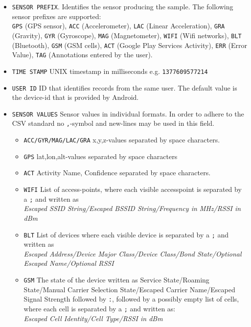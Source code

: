 \begin{itemize}
\item \texttt{SENSOR PREFIX}. Identifies the sensor producing the
  sample. The following sensor prefixes are supported: \\
  \texttt{GPS} (GPS sensor), \texttt{ACC} (Accelerometer),
  \texttt{LAC} (Linear Acceleration), \texttt{GRA} (Gravity),
  \texttt{GYR} (Gyroscope), \texttt{MAG} (Magnetometer), \texttt{WIFI}
  (Wifi networks), \texttt{BLT} (Bluetooth), \texttt{GSM} (GSM cells),
  \texttt{ACT} (Google Play Services Activity), \texttt{ERR} (Error
  Value), \texttt{TAG} (Annotations entered by the user).
\item \texttt{TIME STAMP} UNIX timestamp in milliseconds
  e.g. \texttt{1377609577214}
\item \texttt{USER ID} ID that identifies records from the same
  user. The default value is the device-id that is provided by
  Android.
\item \texttt{SENSOR VALUES} Sensor values in individual formats. In
  order to adhere to the CSV standard no \texttt{,}-symbol and
  new-lines may be used in this field.
  \begin{itemize}
  \item \texttt{ACC/GYR/MAG/LAC/GRA} x,y,z-values separated by space characters.
  \item \texttt{GPS} lat,lon,alt-values separated by space characters
  \item \texttt{ACT} Activity Name, Confidence separated by space characters.
  \item \texttt{WIFI} List of access-points, where each visible
    accesspoint is separated by a \texttt{;} and written as \\
    {\it Escaped SSID String/Escaped BSSID String/Frequency in MHz/RSSI in dBm}
  \item \texttt{BLT}
    List of devices where each visible device is separated by a \texttt{;}
    and written as \\
    { \it Escaped Address/Device Major Class/Device Class/Bond
      State/Optional Escaped Name/Optional RSSI }
  \item \texttt{GSM}
    The state of the device written as Service State/Roaming State/Manual
    Carrier Selection State/Escaped Carrier Name/Escaped Signal Strength
    followed by \texttt{:}, followed by a possibly empty list of cells,
    where each cell is separated by a \texttt{;} and written as: \\
    {\it Escaped Cell Identity/Cell Type/RSSI in dBm}
  \end{itemize}
\end{itemize}

